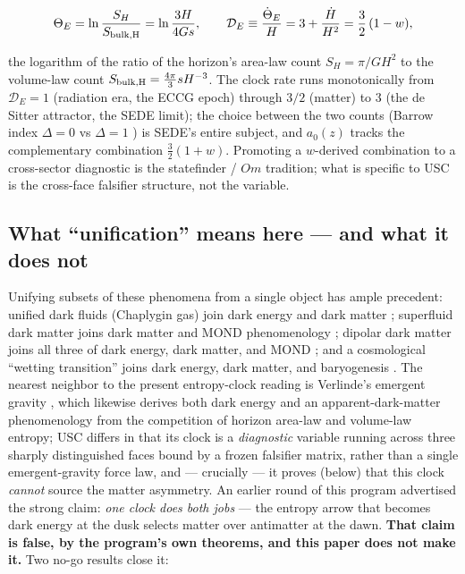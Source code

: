 \documentclass[submission, Phys]{SciPost}
\begin{document}
\begin{equation}
\Theta_E = \ln\frac{S_H}{S_{\rm bulk,H}} = \ln\frac{3H}{4Gs},
\qquad
\mathcal{D}_E \equiv \frac{\dot\Theta_E}{H} = 3 + \frac{\dot H}{H^2} = \frac{3}{2}\,(1-w),
\end{equation}

the logarithm of the ratio of the horizon's area-law count
\(S_H = \pi/GH^2\) to the volume-law count
\(S_{\rm bulk,H} = \tfrac{4\pi}{3}sH^{-3}\). The clock rate runs
monotonically from \(\mathcal{D}_E = 1\) (radiation era, the ECCG epoch)
through \(3/2\) (matter) to \(3\) (the de Sitter attractor, the SEDE
limit); the choice between the two counts (Barrow index \(\Delta = 0\)
vs \(\Delta = 1\) \cite{Barrow:2020tzx}) is SEDE's entire subject, and
\(a_0(z)\) tracks the complementary combination \(\tfrac{3}{2}(1+w)\).
Promoting a \(w\)-derived combination to a cross-sector diagnostic is
the statefinder \cite{Sahni:2002fz} / \(Om\) \cite{Sahni:2008xx}
tradition; what is specific to USC is the cross-face falsifier
structure, not the variable.

\subsection{What ``unification'' means here --- and what it does
not}\label{sec-1-2}

Unifying subsets of these phenomena from a single object has ample
precedent: unified dark fluids (Chaplygin gas) join dark energy and dark
matter \cite{Bento:2003dj}; superfluid dark matter joins dark matter
and MOND phenomenology \cite{Berezhiani:2015bqa, Berezhiani:2015pia};
dipolar dark matter joins all three of dark energy, dark matter, and
MOND \cite{Blanchet:2008fj, Blanchet:2009zu}; and a cosmological
``wetting transition'' joins dark energy, dark matter, and baryogenesis
\cite{Brandenberger:2019jfh}. The nearest neighbor to the present
entropy-clock reading is Verlinde's emergent gravity
\cite{Verlinde:2016toy}, which likewise derives both dark energy and an
apparent-dark-matter phenomenology from the competition of horizon
area-law and volume-law entropy; USC differs in that its clock is a
\emph{diagnostic} variable running across three sharply distinguished
faces bound by a frozen falsifier matrix, rather than a single
emergent-gravity force law, and --- crucially --- it proves (below) that
this clock \emph{cannot} source the matter asymmetry. An earlier round
of this program advertised the strong claim: \emph{one clock does both
jobs} --- the entropy arrow that becomes dark energy at the dusk selects
matter over antimatter at the dawn. \textbf{That claim is false, by the
program's own theorems, and this paper does not make it.} Two no-go
results close it:
\end{document}
